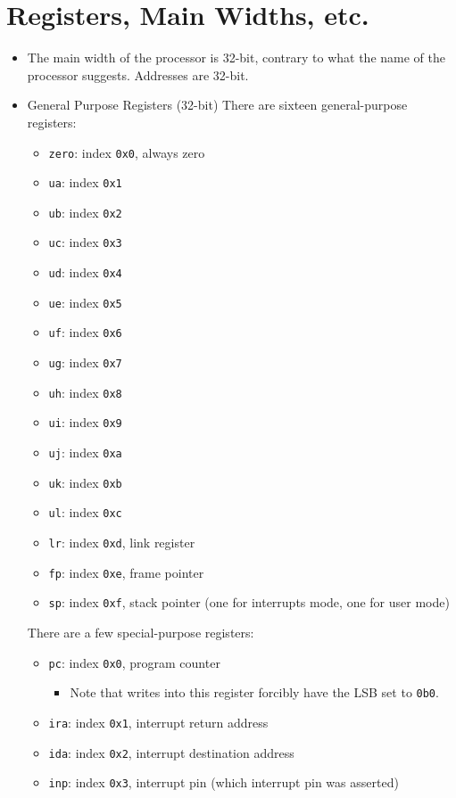 \documentclass{article}
\begin{document}
\section{Registers, Main Widths, etc.}
	\begin{itemize}
	\item The main width of the processor is 32-bit, contrary to what the
		name of the processor suggests.  Addresses are 32-bit. 
	\item General Purpose Registers (32-bit)
		There are sixteen general-purpose registers:
		\begin{itemize}
		\item \texttt{zero}: index \texttt{0x0}, always zero
		\item \texttt{ua}: index \texttt{0x1}
		\item \texttt{ub}: index \texttt{0x2}
		\item \texttt{uc}: index \texttt{0x3}
		\item \texttt{ud}: index \texttt{0x4}
		\item \texttt{ue}: index \texttt{0x5}
		\item \texttt{uf}: index \texttt{0x6}
		\item \texttt{ug}: index \texttt{0x7}
		\item \texttt{uh}: index \texttt{0x8}
		\item \texttt{ui}: index \texttt{0x9}
		\item \texttt{uj}: index \texttt{0xa}
		\item \texttt{uk}: index \texttt{0xb}
		\item \texttt{ul}: index \texttt{0xc}
		\item \texttt{lr}: index \texttt{0xd}, link register
		\item \texttt{fp}: index \texttt{0xe}, frame pointer
		\item \texttt{sp}: index \texttt{0xf}, stack pointer (one for
			interrupts mode, one for user mode)
		\end{itemize}

		There are a few special-purpose registers:
		\begin{itemize}
		\item \texttt{pc}: index \texttt{0x0}, program counter
			\begin{itemize}
			\item Note that writes into this register forcibly have the LSB
				set to \texttt{0b0}.
			\end{itemize}
		\item \texttt{ira}: index \texttt{0x1}, interrupt return address
		\item \texttt{ida}: index \texttt{0x2}, interrupt destination
			address
		\item \texttt{inp}: index \texttt{0x3}, interrupt pin (which
			interrupt pin was asserted)


\end{itemize}
\end{itemize}
\end{document}
